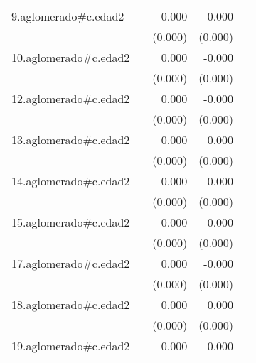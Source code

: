 {\begin{longtable}{l*{4}{D{.}{.}{-1}}}
\addlinespace
9.aglomerado#c.edad2&                     &      -0.000         &      -0.000\sym{**} &                     \\
            &                     &     (0.000)         &     (0.000)         &                     \\
\addlinespace
10.aglomerado#c.edad2&                     &       0.000         &      -0.000         &                     \\
            &                     &     (0.000)         &     (0.000)         &                     \\
\addlinespace
12.aglomerado#c.edad2&                     &       0.000         &      -0.000         &                     \\
            &                     &     (0.000)         &     (0.000)         &                     \\
\addlinespace
13.aglomerado#c.edad2&                     &       0.000\sym{*}  &       0.000         &                     \\
            &                     &     (0.000)         &     (0.000)         &                     \\
\addlinespace
14.aglomerado#c.edad2&                     &       0.000         &      -0.000         &                     \\
            &                     &     (0.000)         &     (0.000)         &                     \\
\addlinespace
15.aglomerado#c.edad2&                     &       0.000         &      -0.000         &                     \\
            &                     &     (0.000)         &     (0.000)         &                     \\
\addlinespace
17.aglomerado#c.edad2&                     &       0.000         &      -0.000         &                     \\
            &                     &     (0.000)         &     (0.000)         &                     \\
\addlinespace
18.aglomerado#c.edad2&                     &       0.000         &       0.000         &                     \\
            &                     &     (0.000)         &     (0.000)         &                     \\
\addlinespace
19.aglomerado#c.edad2&                     &       0.000         &       0.000         &                     \\

\end{longtable}}
